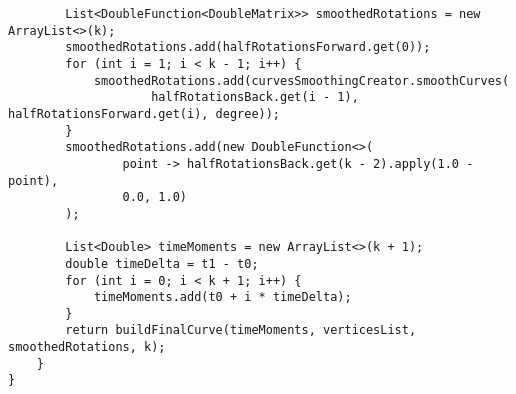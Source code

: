 \begin{verbatim}
        List<DoubleFunction<DoubleMatrix>> smoothedRotations = new ArrayList<>(k);
        smoothedRotations.add(halfRotationsForward.get(0));
        for (int i = 1; i < k - 1; i++) {
            smoothedRotations.add(curvesSmoothingCreator.smoothCurves(
                    halfRotationsBack.get(i - 1), halfRotationsForward.get(i), degree));
        }
        smoothedRotations.add(new DoubleFunction<>(
                point -> halfRotationsBack.get(k - 2).apply(1.0 - point),
                0.0, 1.0)
        );

        List<Double> timeMoments = new ArrayList<>(k + 1);
        double timeDelta = t1 - t0;
        for (int i = 0; i < k + 1; i++) {
            timeMoments.add(t0 + i * timeDelta);
        }
        return buildFinalCurve(timeMoments, verticesList, smoothedRotations, k);
    }
}
\end{verbatim}

